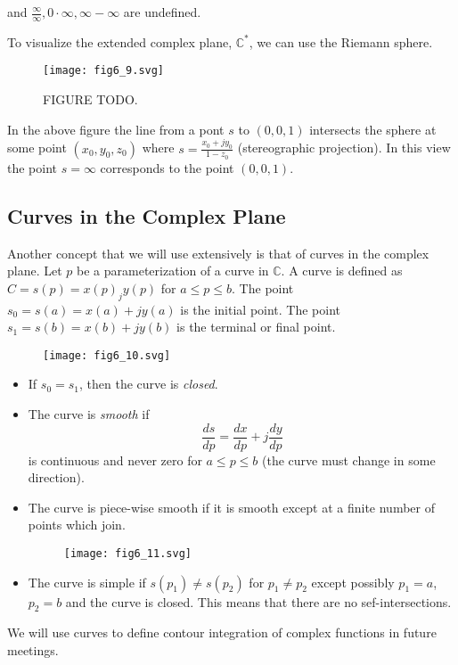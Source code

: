 \documentclass{article}
\begin{document}
and $\frac{\infty}{\infty}, 0\cdot\infty, \infty-\infty$ are undefined.

To visualize the extended complex plane, $\mathbb{C}^*$, we can use the Riemann sphere.

\begin{figure}
  \centering
  \texttt{[image: fig6\_9.svg]}
  \caption{FIGURE TODO.}
\end{figure}

In the above figure the line from a pont $s$ to $(0,0,1)$ intersects the sphere at some point $(x_0,y_0,z_0)$ where $s = \frac{x_0 + jy_0}{1-z_0}$ (stereographic projection). In this view the point $s = \infty$ corresponds to the point $(0,0,1)$.

\subsection{Curves in the Complex Plane}

Another concept that we will use extensively is that of curves in the complex plane. Let $p$ be a parameterization of a curve in $\mathbb{C}$. A curve is defined as $C = s(p) = x(p) _ jy(p)$ for $a \leq p \leq b$. The point $s_0 = s(a) = x(a) + jy(a)$ is the initial point. The point $s_1 = s(b) = x(b) + jy(b)$ is the terminal or final point.

\begin{figure}
  \centering
  \texttt{[image: fig6\_10.svg]}
\end{figure}

\begin{itemize}
\item If $s_0 = s_1$, then the curve is \textit{closed}.
\item The curve is \textit{smooth} if
  \[
  \frac{ds}{dp} = \frac{dx}{dp} + j \frac{dy}{dp} 
  \]
  is continuous and never zero for $a \leq p \leq b$ (the curve must change in some direction).
\item The curve is piece-wise smooth if it is smooth except at a finite number of points which join.
  
\begin{figure}
  \centering
  \texttt{[image: fig6\_11.svg]}
\end{figure}

\item The curve is simple if $s(p_1) \neq s(p_2)$ for $p_1 \neq p_2$ except possibly $p_1=a$, $p_2 = b$ and the curve is closed. This means that there are no sef-intersections. 
\end{itemize}

We will use curves to define contour integration of complex functions in future meetings.
\end{document}
